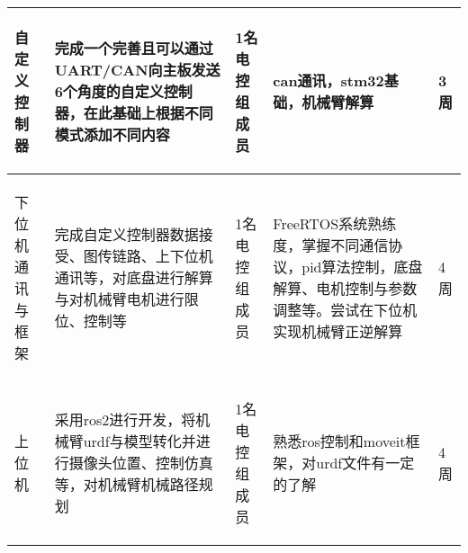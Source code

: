 \begin{longtable}{ p{2cm} | p{3cm} | p{3cm} | p{4.8cm} | p{2cm} |}
    \hline
        \begin{center}
            自定义控制器
        \end{center} &
        \begin{center}
            完成一个完善且可以通过UART/CAN向主板发送6个角度的自定义控制器，在此基础上根据不同模式添加不同内容
        \end{center} &
        \begin{center}
            1名电控组成员
        \end{center} &
        \begin{center}
            can通讯，stm32基础，机械臂解算
        \end{center} &
        \begin{center}
            3周
        \end{center}\\

    \hline
    
        \begin{center}
            下位机通讯与框架
        \end{center} &
        \begin{center}
            完成自定义控制器数据接受、图传链路、上下位机通讯等，对底盘进行解算与对机械臂电机进行限位、控制等
        \end{center} &
        \begin{center}
            1名电控组成员
        \end{center} &
        \begin{center}
            FreeRTOS系统熟练度，掌握不同通信协议，pid算法控制，底盘解算、电机控制与参数调整等。尝试在下位机实现机械臂正逆解算
        \end{center} &
        \begin{center}
            4周
        \end{center} \\
        
    \hline
    
        \begin{center}
            上位机
        \end{center} &
        \begin{center}
            采用ros2进行开发，将机械臂urdf与模型转化并进行摄像头位置、控制仿真等，对机械臂机械路径规划
        \end{center} &
        \begin{center}
            1名电控组成员
        \end{center} &
        \begin{center}
            熟悉ros控制和moveit框架，对urdf文件有一定的了解
        \end{center} &
        \begin{center}
            4周
        \end{center}\\


\end{longtable}

